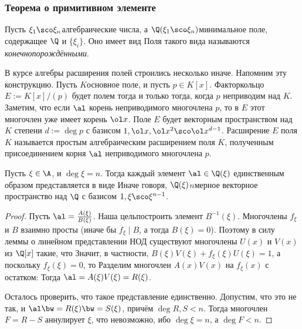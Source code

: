 \documentclass[a4paper]{article}
\begin{document}
\subsubsection{Теорема о примитивном элементе}

Пусть $\xi_1\sco \xi_n$\т  алгебраические числа, а $\Q(\xi_1\sco \xi_n)$\т  минимальное поле,
содержащее $\Q$ и $\{\xi_i\}$. Оно имеет вид
Поля такого вида называются \emph{конечнопорождёнными}.

\begin{petit}
В курсе алгебры расширения полей строились несколько иначе. Напомним эту конструкцию.
Пусть $K$\т основное поле, и пусть $p \in K[x]$. Факторкольцо $E := K[x]/(p)$ будет полем
тогда и только тогда, когда $p$ неприводим над $K$. Заметим, что если $\al$\т
корень неприводимого многочлена $p$, то в $E$ этот многочлен уже имеет корень $\ol x$.
Поле $E$ будет векторным пространством над $K$ степени $d := \deg p$ с базисом $1, \ol x, \ol x^2\sco \ol x^{d-1}$.
Расширение $E$ поля $K$ называется простым алгебраическим расширением поля $K$,
полученным присоединением корня $\al$ неприводимого многочлена $p$.
\end{petit}

\begin{lemma}
Пусть $\xi\in \A$, и $\deg\xi=n$. Тогда каждый элемент $\al\in\Q(\xi)$ единственным
образом представляется в виде
Иначе говоря, $\Q(\xi)$\т  $n$\д мерное векторное пространство над $\Q$ с базисом
$1,\xi\sco \xi^{n-1}$.
\end{lemma}
\begin{proof}
Пусть $\al=\frac{A(\xi)}{B(\xi)}$. Наша цель\т построить элемент $B^{-1}(\xi)$. Многочлены $f_{\xi}$ и $B$ взаимно просты (иначе бы $f_{\xi}\mid B$,
а тогда $B(\xi)=0$). Поэтому в силу леммы о линейном представлении НОД существуют многочлены
$U(x)$ и $V(x)$ из $\Q[x]$ такие, что
Значит, в частности, $B(\xi)V(\xi)+f_{\xi}(\xi)U(\xi)=1$, а поскольку $f_\xi(\xi) = 0$, то
Разделим многочлен $A(x)V(x)$ на $f_{\xi}(x)$ с остатком:
Тогда $\al=A(\xi)V(\xi)=R(\xi)$.

Осталось проверить, что такое представление единственно. Допустим, что это не так, и
$\al\bw=R(\xi)\bw=S(\xi)$, причём $\deg R,S<n$. Тогда многочлен $F=R-S$ аннулирует $\xi$,
что невозможно, ибо $\deg\xi=n$, а $\deg F < n$.
\end{proof}
\end{document}
